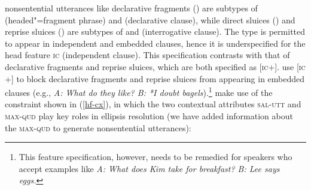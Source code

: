 nonsentential utterances like declarative fragments () are subtypes of  (headed"=fragment phrase) and  (declarative clause), while direct sluices () and reprise sluices () are subtypes of  and  (interrogative clause). The type  is permitted to appear in independent and embedded clauses, hence it is underspecified for the head feature \textsc{ic} (independent clause). This specification contrasts with that of declarative fragments and reprise sluices, which are both specified as [\textsc{ic}+]. \citet[305]{Ginzburg:Sag:2000} use [\textsc{ic} +]  to block declarative fragments and reprise sluices from appearing in embedded clauses (e.g., \textit{A: What do they like? B: *I doubt bagels}).\footnote{This feature specification, however, needs to be remedied for speakers who accept examples like \textit{A: What does Kim take for breakfast? B: Lee says eggs.}}
%
\citet[304]{Ginzburg:Sag:2000} make use of the constraint shown in (\ref{hf-cx}), in which 
the two contextual attributes \textsc{sal-utt} and \textsc{max-qud} play key roles in ellipsis resolution
(we have added information about the \textsc{max-qud} to generate nonsentential utterances):
%

